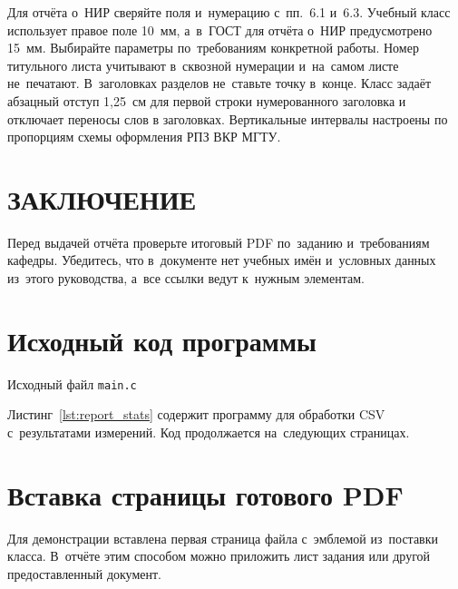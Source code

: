\documentclass{bmstu}
\begin{document}
Для отчёта о~НИР сверяйте поля и~нумерацию с~пп.~6.1 и~6.3.
Учебный класс использует правое поле 10~мм, а~в~ГОСТ для отчёта о~НИР предусмотрено 15~мм.
Выбирайте параметры по~требованиям конкретной работы.
Номер титульного листа учитывают в~сквозной нумерации и~на~самом листе не~печатают.
В~заголовках разделов не~ставьте точку в~конце.
Класс задаёт абзацный отступ 1,25~см для первой строки нумерованного заголовка и отключает переносы слов в заголовках.
Вертикальные интервалы настроены по пропорциям схемы оформления РПЗ ВКР МГТУ.

\chapter*{ЗАКЛЮЧЕНИЕ}

Перед выдачей отчёта проверьте итоговый PDF по~заданию и~требованиям кафедры.
Убедитесь, что в~документе нет учебных имён и~условных данных из~этого руководства, а~все ссылки ведут к~нужным элементам.

\makebibliography

\begin{appendices}
    \chapter{Исходный код программы}
    \label{app:source}
        {Исходный файл \texttt{main.c}}

    Листинг~\ref{lst:report_stats} содержит программу для обработки CSV с~результатами измерений. Код продолжается на~следующих страницах.


    \chapter{Вставка страницы готового PDF}
    \label{app:pdf}
    Для демонстрации вставлена первая страница файла с~эмблемой из~поставки класса. В~отчёте этим способом можно приложить лист задания или другой предоставленный документ.
    
\end{appendices}
\end{document}
